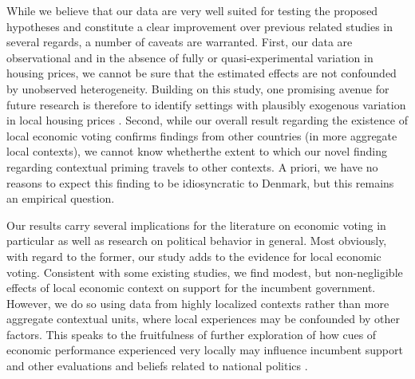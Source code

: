 \documentclass[12pt,a4paper]{article}
\begin{document}
	
	While we believe that our data are very well suited for testing the proposed hypotheses and constitute a clear improvement over previous related studies in several regards, a number of caveats are warranted. First, our data are observational and in the absence of fully or quasi-experimental variation in housing prices, we cannot be sure that the estimated effects are not confounded by unobserved heterogeneity. Building on this study, one promising avenue for future research is therefore to identify settings with plausibly exogenous variation in local housing prices \citep{jerzak2016property}. Second, while our overall result regarding the existence of local economic voting confirms findings from other countries (in more aggregate local contexts), we cannot know whetherthe extent to which our novel finding regarding contextual priming travels to other contexts. A priori, we have no reasons to expect this finding to be idiosyncratic to Denmark, but this remains an empirical question. 
	
	Our results carry several implications for the literature on economic voting in particular as well as research on political behavior in general. Most obviously, with regard to the former, our study adds to the evidence for local economic voting. Consistent with some existing studies, we find modest, but non-negligible effects \cite{healy2013retrospective} of local economic context on support for the incumbent government. However, we do so using data from highly localized contexts rather than more aggregate contextual units, where local experiences may be confounded by other factors. This speaks to the fruitfulness of further exploration of how cues of economic performance experienced very locally may influence incumbent support and other evaluations and beliefs related to national politics \citep[e.g.,][]{burnett2017politics}.
	
\end{document}
